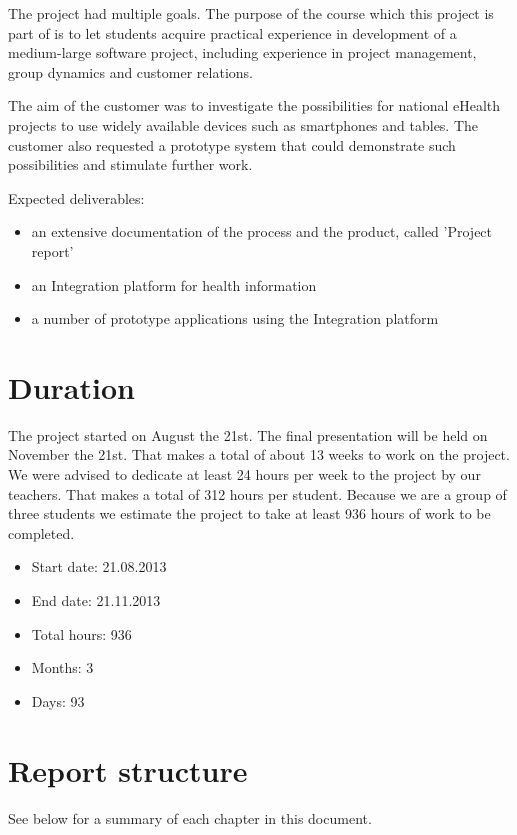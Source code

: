 The project had multiple goals.
The purpose of the course which this project is part of is to let students acquire practical experience in development
of a medium-large software project, including experience in project management, group dynamics and customer relations.

The aim of the customer was to investigate the possibilities for national eHealth projects to use widely available
devices such as smartphones and tables. The customer also requested a prototype system that could demonstrate such
possibilities and stimulate further work.

Expected deliverables:
\begin{itemize}
\item an extensive documentation of the process and the product, called 'Project report'
\item an Integration platform for health information
\item a number of prototype applications using the Integration platform
\end{itemize}

\section{Duration}
\label{section:duration}
The project started on August the 21st. The final presentation will be held on November the 21st.
That makes a total of about 13 weeks to work on the project.
We were advised to dedicate at least 24 hours per week to the project by our teachers.
That makes a total of 312 hours per student. Because we are a group of three students we estimate
the project to take at least 936 hours of work to be completed.

\begin{itemize}
\item Start date: 21.08.2013
\item End date: 21.11.2013
\item Total hours: 936
\item Months: 3
\item Days: 93
\end{itemize}

\section{Report structure}

See below for a summary of each chapter in this document.

